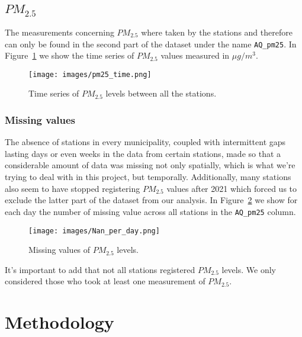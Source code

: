 \documentclass[11pt,a4paper]{article}
\begin{document}

\subsection{$PM_{2.5}$}
\label{subsec:pm25}

The measurements concerning $PM_{2.5}$ where taken by the stations and therefore can only be found in the second part of the dataset under the name \texttt{AQ\_pm25}.
In Figure~\ref{fig:pm25_series} we show the time series of $PM_{2.5}$ values measured in $\mu g/m^3$.

\begin{figure}[H]
    \centering
    \texttt{[image: images/pm25\_time.png]}
    \caption{Time series of $PM_{2.5}$ levels between all the stations.}
    \label{fig:pm25_series}
\end{figure}

\subsubsection{Missing values}

The absence of stations in every municipality, coupled with intermittent gaps lasting days or even weeks in the data from certain stations, made so that a considerable amount of data was missing not only spatially, which is what we're trying to deal with in this project, but temporally. Additionally, many stations also seem to have stopped registering $PM_{2.5}$ values after 2021 which forced us to exclude the latter part of the dataset from our analysis. In Figure~\ref{fig:pm25_missing} we show for each day the number of missing value across all stations in the \texttt{AQ\_pm25} column.

\begin{figure}[H]
    \centering
    \texttt{[image: images/Nan\_per\_day.png]}
    \caption{Missing values of $PM_{2.5}$ levels.}
    \label{fig:pm25_missing}
\end{figure}

It's important to add that not all stations registered $PM_{2.5}$ levels. We only considered those who took at least one measurement of $PM_{2.5}$.

\section{Methodology}
\label{sec:methodology}
\end{document}
